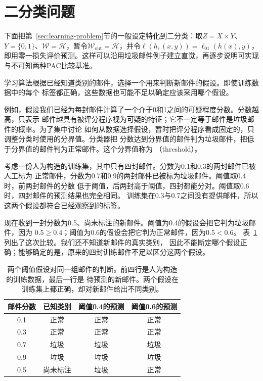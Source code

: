 \section{二分类问题}
\label{sec:statistical-learning-problem}

下面把第~\ref{sec:learning-problem}节的一般设定特化到二分类：取$Z=X\times Y$、$Y=\{0,1\}$、$\mathcal W=\mathcal H$，暂令$\mathcal W_{\mathrm{out}}=\mathcal H$，并令$\ell(h,(x,y))=\ell_{01}(h(x),y)$，即用零一损失评价预测。这样可以沿用垃圾邮件例子建立直觉，再逐步说明可实现与不可知两种PAC比较基准。

学习算法根据已经知道类别的邮件，选择一个用来判断新邮件的假设。即使训练数据中的每个
标签都正确，这些数据也可能不足以确定应该采用哪个假设。

例如，假设我们已经为每封邮件计算了一个介于0和1之间的可疑程度分数。分数越高，只表示
邮件越具有被评分程序视为可疑的特征；它不一定等于邮件是垃圾邮件的概率。为了集中讨论
如何从数据选择假设，暂时把评分程序看成固定的，只调整分类时使用的分界值。分类器把
分数达到分界值的邮件判为垃圾邮件，把低于分界值的邮件判为正常邮件。这个分界值称为
（threshold）。

考虑一份人为构造的训练集，其中只有四封邮件。分数为0.1和0.3的两封邮件已被人工标为
正常邮件，分数为0.7和0.9的两封邮件已被标为垃圾邮件。阈值取0.4时，前两封邮件的分数
低于阈值，后两封高于阈值，四封都能分对。阈值取0.6时，四封邮件的预测结果也完全相同。
训练集在0.3与0.7之间没有提供邮件，所以这两个假设都符合已经观察到的标签。

现在收到一封分数为0.5、尚未标注的新邮件。阈值为0.4的假设会把它判为垃圾邮件，因为
$0.5\geq0.4$；阈值为0.6的假设会把它判为正常邮件，因为$0.5<0.6$。
表~\ref{tab:threshold-email-decisions}列出了这次比较。我们还不知道新邮件的真实类别，
因此不能断定哪个假设正确；能够确定的是，原来的四封训练邮件不足以区分这两个假设。

\begin{table}[htbp]
 \centering
 \begin{tabular}{cccc}
  \toprule
  邮件分数 & 已知类别 & 阈值0.4的预测 & 阈值0.6的预测\\
  \midrule
  0.1 & 正常 & 正常 & 正常\\
  0.3 & 正常 & 正常 & 正常\\
  0.7 & 垃圾 & 垃圾 & 垃圾\\
  0.9 & 垃圾 & 垃圾 & 垃圾\\
  \midrule
  0.5 & 尚未标注 & 垃圾 & 正常\\
  \bottomrule
 \end{tabular}
 \caption{两个阈值假设对同一组邮件的判断。前四行是人为构造的训练数据，最后一行是
 待预测的新邮件。两个假设在训练集上都正确，却对新邮件给出不同类别。}
 \label{tab:threshold-email-decisions}
\end{table}

